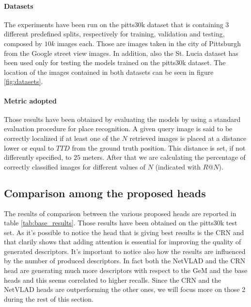 \documentclass[10pt,twocolumn,letterpaper]{article}
\begin{document}
\paragraph{Datasets}
The experiments have been run on the pitts30k dataset \cite{NETVLAD} that is containing 3 different predefined splits, respectively for 
training, validation and testing, composed by $10k$ images each. Those are images taken in the city of Pittsburgh from the Google street
view images. In addition, also the St. Lucia dataset \cite{st_lucia} has been used only for testing the models trained on the pitts30k dataset.
The location of the images contained in both datasets can be seen in figure \ref{fig:datasets}.

\paragraph{Metric adopted}
Those results have been obtained by evaluating the models by using a standard evaluation procedure for place recognition.
A given query image is said to be correctly localized if at least one of the $N$ retrieved images is placed at a distance lower
or equal to $TTD$ from the ground truth position. This distance is set, if not differently specified, to $25$ meters. After
that we are calculating the percentage of correctly classified images for different values of $N$ (indicated with $R@N$).  

\subsection{Comparison among the proposed heads}
The results of comparison between the various proposed heads are reported in table \ref{tab:base_results}. Those results have 
been obtained on the pitts30k test set. As it's possible to notice the head that is giving best results is the CRN and that clarily
shows that adding attention is essential for improving the quality of generated descriptors. It's important to notice also how 
the results are influenced by the number of produced descriptors. In fact both the NetVLAD and the CRN head are generating much 
more descriptors with respect to the GeM and the base heads and this seems correlated to higher recalls. Since the CRN and the NetVLAD
heads are outperforming the other ones, we will focus more on those 2 during the rest of this section.
\end{document}
